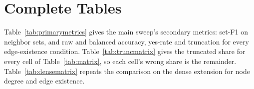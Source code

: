 \documentclass[11pt]{article}
\begin{document}
\section{Complete Tables}
\label{app:tables}
Table~\ref{tab:primarymetrics} gives the main sweep's secondary metrics: set-F1 on neighbor sets, and raw and balanced accuracy, yes-rate and truncation for every edge-existence condition. Table~\ref{tab:truncmatrix} gives the truncated share for every cell of Table~\ref{tab:matrix}, so each cell's wrong share is the remainder. Table~\ref{tab:densematrix} repeats the comparison on the dense extension for node degree and edge existence.




\end{document}
